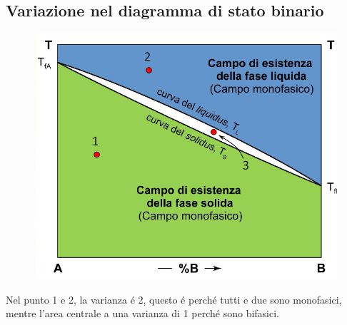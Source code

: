 \documentclass{article}
\begin{document}
{        \subsection{Variazione nel diagramma di stato binario}
            \begin{figure}[!h]
                \centering
                \includegraphics[width=.85\linewidth]{Esempio di variazione in diagramma di stato binario .png}
            \end{figure}
            Nel punto 1 e 2, la varianza \'e 2, questo \'e perch\'e tutti e due sono monofasici, mentre l'area centrale a una varianza di 1 perch\'e sono bifasici.
            \newpage
}
\end{document}
